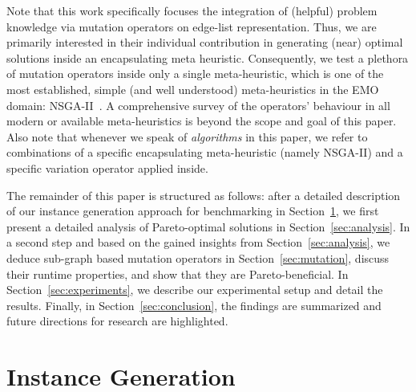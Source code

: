 \documentclass[twoside]{article}
\begin{document}
 Note that this work specifically focuses the integration of (helpful) problem knowledge via mutation operators on edge-list representation. Thus, we are primarily interested in their individual contribution in generating (near) optimal solutions inside an encapsulating meta heuristic. Consequently, we test a plethora of mutation operators inside only a single meta-heuristic, which is one of the most established, simple (and well understood) meta-heuristics in the EMO domain: NSGA-II~\citep{DPAM02}.
 A comprehensive survey of the operators' behaviour in all modern or available meta-heuristics is beyond the scope and goal of this paper. Also note that whenever we speak of \emph{algorithms} in this paper, we refer to combinations of a specific encapsulating meta-heuristic (namely NSGA-II) and a specific variation operator applied inside.
 
 The remainder of this paper is structured as follows: after a detailed description of our instance generation approach for benchmarking in Section~\ref{sec:instances}, we first present a detailed analysis of Pareto-optimal solutions in Section~\ref{sec:analysis}. In a second step and based on the gained insights from Section~\ref{sec:analysis}, we deduce sub-graph based mutation operators in Section~\ref{sec:mutation}, discuss their runtime properties, and show that they are Pareto-beneficial. In Section~\ref{sec:experiments}, we describe our experimental setup and detail the results. Finally, in Section~\ref{sec:conclusion}, the findings are summarized and future directions for research are highlighted.



\section{Instance Generation}
\label{sec:instances}
\end{document}
